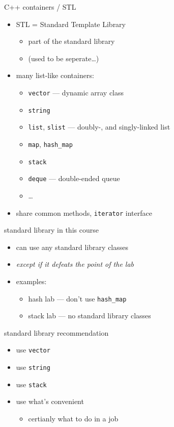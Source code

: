 \begin{frame}{C++ containers / STL}
    \begin{itemize}
    \item STL = Standard Template Library
        \begin{itemize}
        \item part of the standard library
        \item (used to be seperate\ldots)
        \end{itemize}
    \item many list-like containers:
        \begin{itemize}
        \item \texttt{vector} --- dynamic array class
        \item \texttt{string}
        \item \texttt{list}, \texttt{slist} --- doubly-, and singly-linked list
        \item \texttt{map}, \texttt{hash\_map}
        \item \texttt{stack}
        \item \texttt{deque} --- double-ended queue
        \item \ldots
        \end{itemize}
    \item share common methods, \texttt{iterator} interface
    \end{itemize}
\end{frame}

\begin{frame}{standard library in this course}
    \begin{itemize}
    \item can use any standard library classes
    \item \textit{except if it defeats the point of the lab}
    \item examples:
        \begin{itemize}
        \item hash lab --- don't use \texttt{hash\_map}
        \item stack lab --- no standard library classes
        \end{itemize}
    \end{itemize}
\end{frame}

\begin{frame}{standard library recommendation}
    \begin{itemize}
        \item use \texttt{vector}
        \item use \texttt{string}
        \item use \texttt{stack}
        \item use what's convenient
            \begin{itemize}
            \item certianly what to do in a job
            \end{itemize}
    \end{itemize}
\end{frame}
